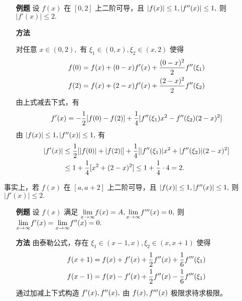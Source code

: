 \begin{enumerate}
    \item[\textbf{例题}] 设 $ f(x) $ 在 $ [0,2] $ 上二阶可导，且 
    $ |f(x)|\leq 1, |f^{\prime\prime}(x)|\leq 1, $ 则 $ |f'(x)|\leq 2. $ 
    \item[\textbf{方法}] 
    
    对任意 $ x\in (0,2), $ 有 $ \xi_1\in(0,x),\xi_2\in(x,2) $ 使得
    \begin{equation*}
        \begin{aligned}
            &f(0) = f(x) + (0-x)f'(x) + \dfrac{(0-x)^2}{2}f^{\prime\prime}(\xi_1)\\ 
            &f(2) = f(x) + (2-x)f'(x) + \dfrac{(2-x)^2}{2}f^{\prime\prime}(\xi_2)    
        \end{aligned}
    \end{equation*}
    由上式减去下式，有
    \begin{equation*}
        \begin{aligned}
            f'(x) = -\dfrac{1}{2}[f(0)-f(2)]+\dfrac{1}{4}[f^{\prime\prime}(\xi_1)x^2-f^{\prime\prime}(\xi_2)(2-x)^2]
        \end{aligned}
    \end{equation*}
    由 $ |f(x)|\leq 1, |f^{\prime\prime}(x)|\leq 1, $ 有
    \begin{equation*}
        \begin{aligned}
            |f'(x)|&\leq \dfrac{1}{2}[|f(0)|+|f(2)|]+\dfrac14 
            [|f^{\prime\prime}(\xi_1)|x^2+|f^{\prime\prime}(\xi_2)|(2-x)^2]\\ 
            &\leq 1 + \dfrac{1}{4}[x^2 + (2-x)^2]\leq 1+\dfrac{1}{4}\cdot 4 = 2.
        \end{aligned}
    \end{equation*}
\end{enumerate}

事实上，若 $ f(x) $ 在 $ [a,a+2] $ 上二阶可导，且 $ |f(x)|\leq 1, |f^{\prime\prime}(x)|\leq 1, $ 
则 $ |f'(x)|\leq 2. $ 

\begin{enumerate}
    \item[\textbf{例题}] 设 $ f(x) $ 满足 $ {\displaystyle\lim_{x\rightarrow \infty}}f(x) = A,
    {\displaystyle\lim_{x\rightarrow \infty}}f^{{\prime\prime\prime}}(x) = 0, $ 
    则 $ {\displaystyle\lim_{x\rightarrow \infty}}f'(x) = 
    {\displaystyle\lim_{x\rightarrow \infty}}f^{\prime\prime}(x) = 0. $ 
    \item[\textbf{方法}] 由泰勒公式，存在 $ \xi_1 \in (x-1,x),\xi_2 \in (x,x+1) $ 使得
    \begin{equation*}
        \begin{aligned}
            &f(x + 1) = f(x) + f'(x) + \dfrac{1}{2}f^{\prime\prime}(x) + \dfrac{1}{6}f^{\prime\prime\prime}(\xi_1) \\ 
            &f(x - 1) = f(x) - f'(x) + \dfrac{1}{2}f^{\prime\prime}(x) - \dfrac{1}{6}f^{\prime\prime\prime}(\xi_1) \\ 
        \end{aligned}
    \end{equation*}
    通过加减上下式构造 $ f'(x),f^{\prime\prime}(x), $ 
    由 $ f(x),f^{\prime\prime\prime}(x) $ 极限求待求极限。
\end{enumerate}